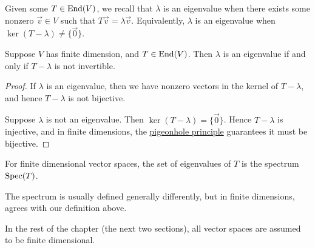 \begin{definition}
    Given some \(T \in \operatorname{End}(V)\),
    we recall that \(\lambda\) is an eigenvalue when
    there exists some nonzero \(\vec{v} \in V\) such that \(T\vec{v} = \lambda\vec{v}\).
    Equivalently, \(\lambda\) is an eigenvalue when \(\ker(T-\lambda) \neq \{\vec{0}\}\).
\end{definition}
\begin{lemma}
    Suppose \(V\) has finite dimension, and \(T \in \operatorname{End}(V)\).
    Then \(\lambda\) is an eigenvalue if and only if \(T - \lambda\) is not invertible.
\end{lemma}
\begin{proof}
    If \(\lambda\) is an eigenvalue,
    then we have nonzero vectors in the kernel of \(T-\lambda\),
    and hence \(T-\lambda\) is not bijective.

    Suppose \(\lambda\) is not an eigenvalue.
    Then \(\ker(T-\lambda) = \{\vec{0}\}\).
    Hence \(T-\lambda\) is injective, and in finite dimensions,
    the \hyperref[thm:pigeonhole]{pigeonhole principle} guarantees it must be bijective.
\end{proof}
\begin{definition}
    For finite dimensional vector spaces,
    the set of eigenvalues of \(T\) is the spectrum \(\operatorname{Spec}(T)\).
\end{definition}
\begin{remark}
    The spectrum is usually defined generally differently,
    but in finite dimensions, agrees with our definition above.
\end{remark}

\begin{remark}
    In the rest of the chapter (the next two sections),
    all vector spaces are assumed to be finite dimensional.
\end{remark}

